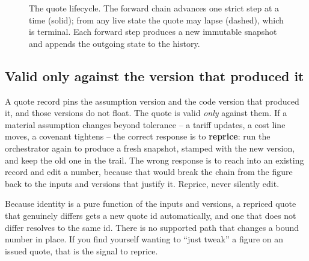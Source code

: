 \begin{figure}[H]
\centering
{}
\caption{The quote lifecycle. The forward chain advances one strict step at a time (solid); from any live state the quote may lapse (dashed), which is terminal. Each forward step produces a new immutable snapshot and appends the outgoing state to the history.}
\label{fig:quote-lifecycle}
\end{figure}

\subsection{Valid only against the version that produced it}

A quote record pins the assumption version and the code version that produced it, and those versions do not float. The quote is valid \emph{only} against them. If a material assumption changes beyond tolerance -- a tariff updates, a cost line moves, a covenant tightens -- the correct response is to \textbf{reprice}: run the orchestrator again to produce a fresh snapshot, stamped with the new version, and keep the old one in the trail. The wrong response is to reach into an existing record and edit a number, because that would break the chain from the figure back to the inputs and versions that justify it. Reprice, never silently edit.

\begin{caution}
Because identity is a pure function of the inputs and versions, a repriced quote that genuinely differs gets a new quote id automatically, and one that does not differ resolves to the same id. There is no supported path that changes a bound number in place. If you find yourself wanting to ``just tweak'' a figure on an issued quote, that is the signal to reprice.
\end{caution}

